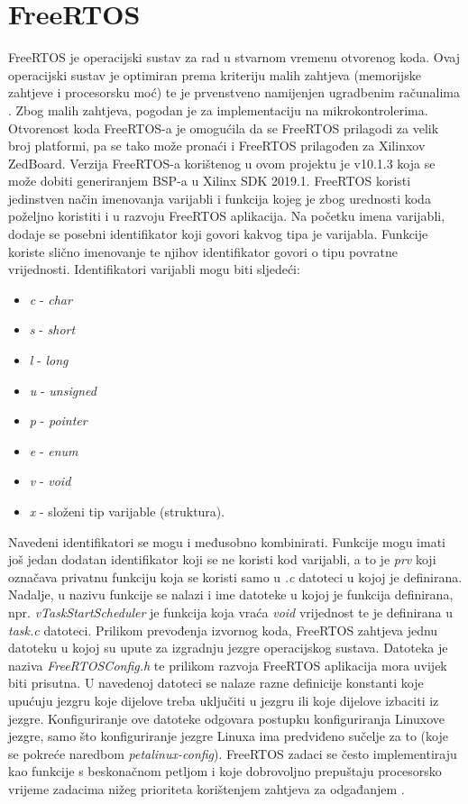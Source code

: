 \documentclass[times, utf8, diplomski, numeric]{fer}
\begin{document}
\section{FreeRTOS}
FreeRTOS je operacijski sustav za rad u stvarnom vremenu otvorenog koda. Ovaj operacijski sustav je optimiran prema kriteriju
malih zahtjeva (memorijske zahtjeve i procesorsku moć) te je prvenstveno namijenjen ugradbenim računalima \cite{osur}. Zbog
malih zahtjeva, pogodan je za implementaciju na mikrokontrolerima. Otvorenost koda FreeRTOS-a je omogućila da se FreeRTOS
prilagodi za velik broj platformi, pa se tako može pronaći i FreeRTOS prilagođen za Xilinxov ZedBoard. Verzija FreeRTOS-a
korištenog u ovom projektu je v10.1.3 koja se može dobiti generiranjem BSP-a  u Xilinx SDK
2019.1. FreeRTOS koristi jedinstven način imenovanja varijabli i funkcija kojeg je zbog urednosti koda poželjno koristiti i
u razvoju FreeRTOS aplikacija. Na početku imena varijabli, dodaje se posebni identifikator koji govori kakvog tipa je
varijabla. Funkcije koriste slično imenovanje te njihov identifikator govori o tipu povratne vrijednosti. Identifikatori
varijabli mogu biti sljedeći:
\begin{itemize}
  \item{\textit{c} - \textit{char}}
  \item{\textit{s} - \textit{short}}
  \item{\textit{l} - \textit{long}}
  \item{\textit{u} - \textit{unsigned}}
  \item{\textit{p} - \textit{pointer}}
  \item{\textit{e} - \textit{enum}}
  \item{\textit{v} - \textit{void}}
  \item{\textit{x} - složeni tip varijable (struktura).}
\end{itemize}
Navedeni identifikatori se mogu i međusobno kombinirati. Funkcije mogu imati još jedan dodatan identifikator koji se ne koristi
kod varijabli, a to je \textit{prv} koji označava privatnu funkciju koja se koristi samo u \textit{.c} datoteci u kojoj je
definirana. Nadalje, u nazivu funkcije se nalazi i ime datoteke u kojoj je funkcija definirana, npr.
\textit{vTaskStartScheduler} je funkcija koja vraća \textit{void} vrijednost te je definirana u \textit{task.c} datoteci.
Prilikom prevođenja izvornog koda, FreeRTOS zahtjeva jednu datoteku u kojoj su upute za izgradnju jezgre operacijskog sustava.
Datoteka je naziva \textit{FreeRTOSConfig.h} te prilikom razvoja FreeRTOS aplikacija mora uvijek biti prisutna. U navedenoj
datoteci se nalaze razne definicije konstanti koje upućuju jezgru koje dijelove treba uključiti u jezgru ili koje dijelove
izbaciti iz jezgre. Konfiguriranje ove datoteke odgovara postupku konfiguriranja Linuxove jezgre, samo što konfiguriranje
jezgre Linuxa ima predviđeno sučelje za to (koje se pokreće naredbom \textit{petalinux-config}). FreeRTOS zadaci se često
implementiraju kao funkcije s beskonačnom petljom i koje dobrovoljno prepuštaju procesorsko vrijeme zadacima nižeg prioriteta
korištenjem zahtjeva za odgađanjem .
\end{document}
